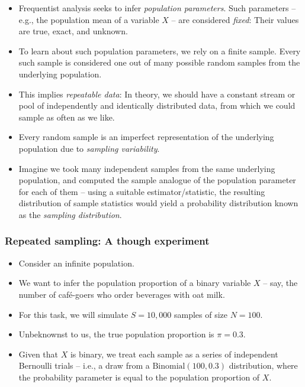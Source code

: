 \documentclass[
  11pt,
]{article}
\providecommand{\tightlist}{%
  \setlength{\itemsep}{0pt}\setlength{\parskip}{0pt}}
\begin{document}
\begin{itemize}
\tightlist
\item
  Frequentist analysis seeks to infer \emph{population parameters}. Such parameters -- e.g., the population mean of a variable \(X\) -- are considered \emph{fixed}: Their values are true, exact, and unknown.
\item
  To learn about such population parameters, we rely on a finite sample. Every such sample is considered one out of many possible random samples from the underlying population.
\item
  This implies \emph{repeatable data}: In theory, we should have a constant stream or pool of independently and identically distributed data, from which we could sample as often as we like.
\item
  Every random sample is an imperfect representation of the underlying population due to \emph{sampling variability}.
\item
  Imagine we took many independent samples from the same underlying population, and computed the sample analogue of the population parameter for each of them -- using a suitable estimator/statistic, the resulting distribution of sample statistics would yield a probability distribution known as the \emph{sampling distribution}.
\end{itemize}

\hypertarget{repeated-sampling-a-though-experiment}{%
\subsubsection{Repeated sampling: A though experiment}\label{repeated-sampling-a-though-experiment}}

\begin{itemize}
\tightlist
\item
  Consider an infinite population.
\item
  We want to infer the population proportion of a binary variable \(X\) -- say, the number of café-goers who order beverages with oat milk.
\item
  For this task, we will simulate \(S=10,000\) samples of size \(N = 100\).
\item
  Unbeknownst to us, the true population proportion is \(\pi = 0.3\).
\item
  Given that \(X\) is binary, we treat each sample as a series of independent Bernoulli trials -- i.e., a draw from a \(\text{Binomial}(100, 0.3)\) distribution, where the probability parameter is equal to the population proportion of \(X\).
\end{itemize}
\end{document}
